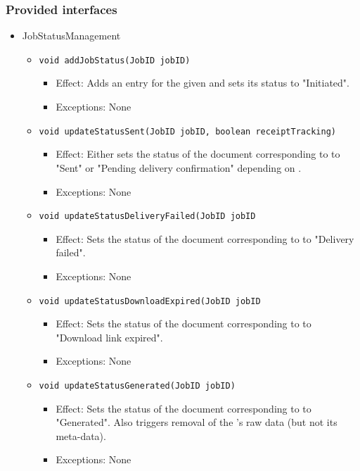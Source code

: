 \subsubsection*{Provided interfaces}
\begin{itemize}
    \item JobStatusManagement
    \begin{itemize}
		\item \texttt{void addJobStatus(JobID jobID)}
		\begin{itemize}
            \item Effect: Adds an entry for the given  and sets its status to "Initiated".
            \item Exceptions: None
        \end{itemize}

		\item \texttt{void updateStatusSent(JobID jobID, boolean receiptTracking)}
		\begin{itemize}
            \item Effect: Either sets the status of the document corresponding to  to "Sent" or "Pending delivery confirmation" depending on .
            \item Exceptions: None
        \end{itemize}

		\item \texttt{void updateStatusDeliveryFailed(JobID jobID}
		\begin{itemize}
            \item Effect: Sets the status of the document corresponding to  to "Delivery failed".
            \item Exceptions: None
        \end{itemize}

		\item \texttt{void updateStatusDownloadExpired(JobID jobID}
		\begin{itemize}
            \item Effect: Sets the status of the document corresponding to  to "Download link expired".
            \item Exceptions: None
        \end{itemize}

		\item \texttt{void updateStatusGenerated(JobID jobID)}
		\begin{itemize}
            \item Effect: Sets the status of the document corresponding to  to "Generated". Also triggers removal of the 's raw data (but not its meta-data).
            \item Exceptions: None
        \end{itemize}


\end{itemize}
\end{itemize}
